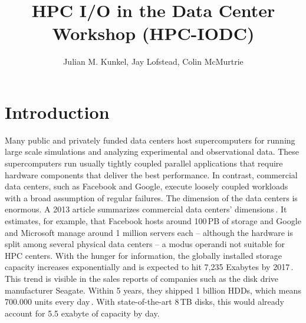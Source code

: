 \documentclass{llncs}
\begin{document}
\mainmatter


\author{Julian M. Kunkel, Jay Lofstead, Colin McMurtrie
}

\title{HPC I/O in the Data Center Workshop (HPC-IODC)}


\maketitle{}

\section{Introduction}
\label{sec:intro}

Many public and privately funded data centers host supercomputers for running large scale simulations and analyzing experimental and observational data.
These supercomputers run usually tightly coupled parallel applications that require hardware components that deliver the best performance.
In contrast, commercial data centers, such as Facebook and Google, execute loosely coupled workloads with a broad assumption of regular failures.
The dimension of the data centers is enormous.
A 2013 article summarizes commercial data centers' dimensions\,\cite{data13}.
It estimates, for example, that Facebook hosts around 100\,PB of storage and Google and Microsoft manage around 1 million servers each -- although the hardware is split among several physical data centers -- a modus operandi not suitable for HPC centers.
With the hunger for information, the globally installed storage capacity increases exponentially and is expected to hit 7,235 Exabytes by 2017\,\cite{EXA13}.
This trend is visible in the sales reports of companies such as the disk drive manufacturer Seagate. Within 5 years, they shipped 1 billion HDDs, which means 700.000 units every day\,\cite{SG14}.
With state-of-the-art 8\,TB disks, this would already account for 5.5 exabyte of capacity by day.
\end{document}
